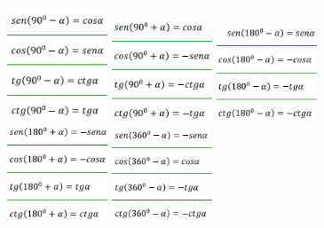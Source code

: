\documentclass{article}
\begin{document}
\begin{figure}[!]
\includegraphics[width=3cm]{ass1.png}
\includegraphics[width=3cm]{ass2.png}
\includegraphics[width=3cm]{ass3.png}
\includegraphics[width=3cm]{ass4.png}
\includegraphics[width=3cm]{ass5.png}
\end{figure}
\end{document}
